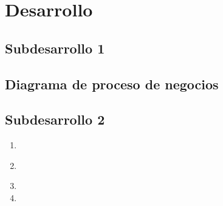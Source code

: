 \section{Desarrollo}
\subsection{Subdesarrollo 1}

\lipsum[1-3] \parencite{knuth1978tex}
\subsection{Diagrama de proceso de negocios}


\subsection{Subdesarrollo 2}

\lipsum[1][1-3]
\begin{enumerate}
    \item \lipsum[1][1-2]
    \item \lipsum[1][1-2] \parencite{goossens1997latex}
    \item \lipsum[1][1-2]
    \item \lipsum[1][1-2]
\end{enumerate}
